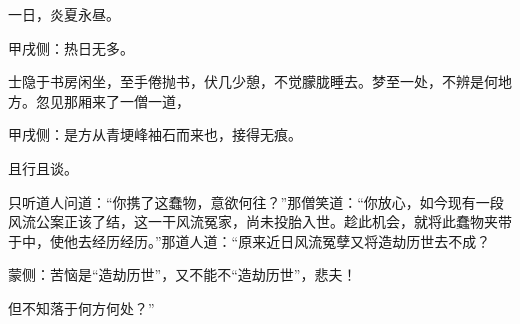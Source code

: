 \begin{parag}
    一日，炎夏永昼。\begin{note}甲戌侧：热日无多。\end{note}士隐于书房闲坐，至手倦抛书，伏几少憩，不觉朦胧睡去。梦至一处，不辨是何地方。忽见那厢来了一僧一道，\begin{note}甲戌侧：是方从青埂峰袖石而来也，接得无痕。\end{note}且行且谈。
\end{parag}


\begin{parag}
    只听道人问道：“你携了这蠢物，意欲何往？”那僧笑道：“你放心，如今现有一段风流公案正该了结，这一干风流冤家，尚未投胎入世。趁此机会，就将此蠢物夹带于中，使他去经历经历。”那道人道：“原来近日风流冤孽又将造劫历世去不成？\begin{note}蒙侧：苦恼是“造劫历世”，又不能不“造劫历世”，悲夫！\end{note}但不知落于何方何处？”
\end{parag}


